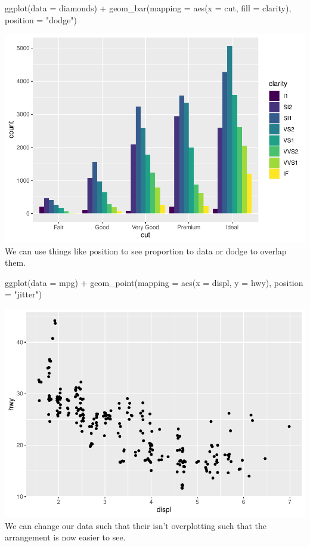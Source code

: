 \documentclass[
]{article}
\newenvironment{Shaded}{\begin{snugshade}}{\end{snugshade}}
\newcommand{\AttributeTok}[1]{\textcolor[rgb]{0.77,0.63,0.00}{#1}}
\newcommand{\FunctionTok}[1]{\textcolor[rgb]{0.00,0.00,0.00}{#1}}
\newcommand{\NormalTok}[1]{#1}
\newcommand{\SpecialCharTok}[1]{\textcolor[rgb]{0.00,0.00,0.00}{#1}}
\newcommand{\StringTok}[1]{\textcolor[rgb]{0.31,0.60,0.02}{#1}}
\begin{document}
\begin{Shaded}
\begin{Highlighting}[]
\FunctionTok{ggplot}\NormalTok{(}\AttributeTok{data =}\NormalTok{ diamonds) }\SpecialCharTok{+} 
  \FunctionTok{geom\_bar}\NormalTok{(}\AttributeTok{mapping =} \FunctionTok{aes}\NormalTok{(}\AttributeTok{x =}\NormalTok{ cut, }\AttributeTok{fill =}\NormalTok{ clarity), }\AttributeTok{position =} \StringTok{"dodge"}\NormalTok{)}
\end{Highlighting}
\end{Shaded}

\includegraphics{Journal_files/figure-latex/unnamed-chunk-55-2.pdf} We
can use things like position to see proportion to data or dodge to
overlap them.

\begin{Shaded}
\begin{Highlighting}[]
\FunctionTok{ggplot}\NormalTok{(}\AttributeTok{data =}\NormalTok{ mpg) }\SpecialCharTok{+} 
  \FunctionTok{geom\_point}\NormalTok{(}\AttributeTok{mapping =} \FunctionTok{aes}\NormalTok{(}\AttributeTok{x =}\NormalTok{ displ, }\AttributeTok{y =}\NormalTok{ hwy), }\AttributeTok{position =} \StringTok{"jitter"}\NormalTok{)}
\end{Highlighting}
\end{Shaded}

\includegraphics{Journal_files/figure-latex/unnamed-chunk-56-1.pdf} We
can change our data such that their isn't overplotting such that the
arrangement is now easier to see.
\end{document}
